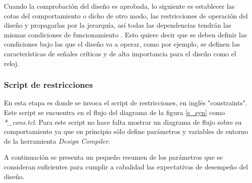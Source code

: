 Cuando la comprobación del diseño es aprobada, lo siguiente es establecer las cotas del comportamiento o dicho de otro modo, las restricciones de operación del diseño y propagarlas por la jerarquía, así todas las dependencias tendrán las mismas condiciones de funcionamiento . Esto quiere decir que se deben definir las condiciones bajo las que el diseño va a operar, como por ejemplo, se definen las características de señales críticas y de alta importancia para el diseño como el reloj.

\subsubsection{Script de restricciones}

En esta etapa es donde se invoca el script de restricciones, en inglés "constraints". Este script se encuentra en el flujo del diagrama de la figura \ref{s_syn} como \textit{*\_cons.tcl}. Para este script no hace falta mostrar un diagrama de flujo sobre su comportamiento ya que en principio sólo define parámetros y variables de entorno de la herramienta \textit{Design Compiler}.

A continuación se presenta un pequeño resumen de los parámetros que se consideran suficientes para cumplir a cabalidad las expectativas de desempeño del diseño.


